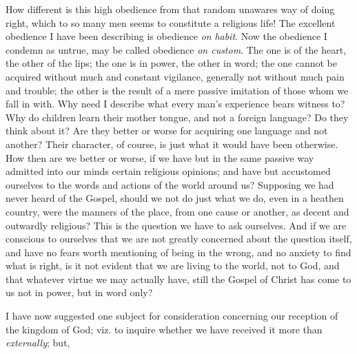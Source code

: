 How different is this high obedience from that random
unawares way of doing right, which to so many men seems
to constitute a religious life! The excellent obedience I
have been describing is obedience \emph{on} \emph{habit}.
Now the obedience I condemn as untrue, may be called
obedience \emph{on custom}. The one is of the heart,
the other of the lips; the one is in power, the other in
word; the one cannot be acquired without much and
constant vigilance, generally not without much pain and
trouble; the other is the result of a mere passive
imitation of those whom we fall in with. Why need I
describe what every man's experience bears witness to?
Why do children learn their mother tongue, and not a
foreign language? Do they think about it? Are they better
or worse for acquiring one language and not another?
Their character, of course, is just what it would have
been otherwise. How then are we better or worse, if we
have but in the same passive way admitted into our minds
certain religious opinions; and have but accustomed
ourselves to the words and actions of the world around
us? Supposing we had never heard of the Gospel, should we
not do just what we do, even in a heathen country, were
the manners of the place, from one cause or another, as
decent and outwardly religious? This is the question we
have to ask ourselves. And if we are conscious to
ourselves that we are not greatly concerned about the
question itself, and have no fears worth mentioning of
being in the wrong, and no anxiety to find what is right,
is it not evident that we are living to the world, not to
God, and that whatever virtue we may actually have, still
the Gospel of Christ has come to us not in power, but in
word only?

I have now suggested one subject for consideration
concerning our reception of the kingdom of God; viz. to
inquire whether we have received it more than \emph{externally};
but,

